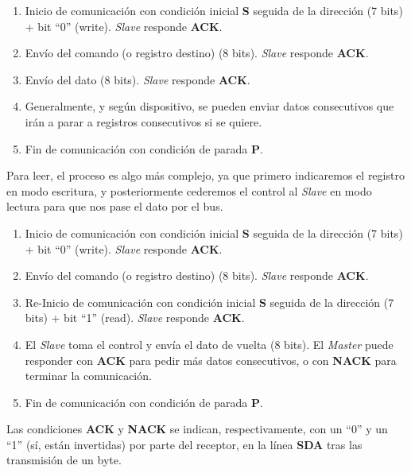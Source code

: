 \documentclass[../main.tex]{subfiles}
\begin{document}
            \begin{enumerate}
                \item Inicio de comunicación con condición inicial \textbf{S} seguida de la dirección (7 bits) + bit ``0'' (write). \emph{Slave} responde \textbf{ACK}.
                \item Envío del comando (o registro destino) (8 bits). \emph{Slave} responde \textbf{ACK}.
                \item Envío del dato (8 bits). \emph{Slave} responde \textbf{ACK}.
                \item Generalmente, y según dispositivo, se pueden enviar datos consecutivos que irán a parar a registros consecutivos si se quiere.
                \item Fin de comunicación con condición de parada \textbf{P}.
            \end{enumerate}

            Para leer, el proceso es algo más complejo, ya que primero indicaremos el registro en modo escritura, y posteriormente cederemos el control al \emph{Slave} en modo lectura para que nos pase el dato por el bus.

            \begin{enumerate}
                \item Inicio de comunicación con condición inicial \textbf{S} seguida de la dirección (7 bits) + bit ``0'' (write). \emph{Slave} responde \textbf{ACK}.
                \item Envío del comando (o registro destino) (8 bits). \emph{Slave} responde \textbf{ACK}.
                \item Re-Inicio de comunicación con condición inicial \textbf{S} seguida de la dirección (7 bits) + bit ``1'' (read). \emph{Slave} responde \textbf{ACK}.
                \item El \emph{Slave} toma el control y envía el dato de vuelta (8 bits). El \emph{Master} puede responder con \textbf{ACK} para pedir más datos consecutivos, o con \textbf{NACK} para terminar la comunicación.
                \item Fin de comunicación con condición de parada \textbf{P}.
            \end{enumerate}

            Las condiciones \textbf{ACK} y \textbf{NACK} se indican, respectivamente, con un ``0'' y un ``1'' (sí, están invertidas) por parte del receptor, en la línea \textbf{SDA} tras las transmisión de un byte.
\end{document}

